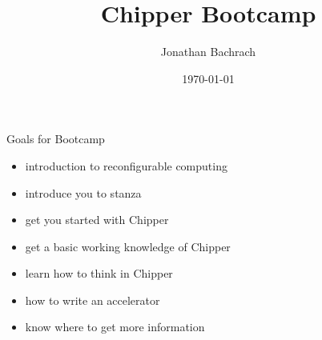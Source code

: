 \documentclass[xcolor=pdflatex,dvipsnames,table]{beamer}
\title{Chipper Bootcamp}
\author{Jonathan Bachrach}
\date{\today}
\institute[UC Berkeley]{EECS UC Berkeley}
\begin{document}
\begin{frame}
\titlepage
\end{frame}
\addtocounter{framenumber}{-1}

\begin{frame}[fragile]{Goals for Bootcamp}

\begin{itemize}
\item introduction to reconfigurable computing
\item introduce you to stanza
\item get you started with Chipper
\item get a basic working knowledge of Chipper
\item learn how to think in Chipper
\item how to write an accelerator
\item know where to get more information
\end{itemize}

\end{frame}
\end{document}
